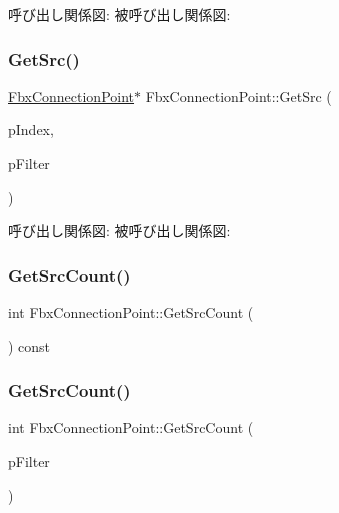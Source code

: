 呼び出し関係図\+:
被呼び出し関係図\+:
\mbox{\label{class_fbx_connection_point_a15464a4a8a8c1040df9389d9a46469f5}} 
\subsubsection{\texorpdfstring{Get\+Src()}{GetSrc()}\hspace{0.1cm}{\footnotesize\ttfamily [2/2]}}
{\footnotesize\ttfamily \hyperlink{class_fbx_connection_point}{Fbx\+Connection\+Point}$\ast$ Fbx\+Connection\+Point\+::\+Get\+Src (\begin{DoxyParamCaption}\item[{int}]{p\+Index,  }\item[{\hyperlink{class_fbx_connection_point_filter}{Fbx\+Connection\+Point\+Filter} $\ast$}]{p\+Filter }\end{DoxyParamCaption})}

呼び出し関係図\+:
被呼び出し関係図\+:
\mbox{\label{class_fbx_connection_point_ad75a1c4144fdfaf7e8bdf4537708ea7c}} 
\subsubsection{\texorpdfstring{Get\+Src\+Count()}{GetSrcCount()}\hspace{0.1cm}{\footnotesize\ttfamily [1/2]}}
{\footnotesize\ttfamily int Fbx\+Connection\+Point\+::\+Get\+Src\+Count (\begin{DoxyParamCaption}{ }\end{DoxyParamCaption}) const}

\mbox{\label{class_fbx_connection_point_a9030ce8968862af50b096d1be9c6e394}} 
\subsubsection{\texorpdfstring{Get\+Src\+Count()}{GetSrcCount()}\hspace{0.1cm}{\footnotesize\ttfamily [2/2]}}
{\footnotesize\ttfamily int Fbx\+Connection\+Point\+::\+Get\+Src\+Count (\begin{DoxyParamCaption}\item[{\hyperlink{class_fbx_connection_point_filter}{Fbx\+Connection\+Point\+Filter} $\ast$}]{p\+Filter }\end{DoxyParamCaption})}

